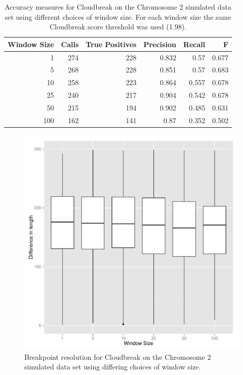 \begin{table}
\begin{center}
\begin{tabular}{r|rrrrr}
 \hline
 Window Size & Calls & True Positives & Precision & Recall & F \\ 
 \hline
   1 & 274 & 228 & 0.832 & 0.57 & 0.677 \\ 
   5 & 268 & 228 & 0.851 & 0.57 & 0.683 \\ 
   10 & 258 & 223 & 0.864 & 0.557 & 0.678 \\ 
   25 & 240 & 217 & 0.904 & 0.542 & 0.678 \\ 
   50 & 215 & 194 & 0.902 & 0.485 & 0.631 \\ 
   100 & 162 & 141 & 0.87 & 0.352 & 0.502 \\  
\end{tabular}
\end{center}
\caption{Accuracy measures for Cloudbreak on the Chromosome 2 simulated data set using different choices of window size. For each window size the same Cloudbreak score threshold was used (1.98).}
\label{chr2AccuracyByWindowSize}
\end{table}
\begin{figure}
\centering
\includegraphics[width=.8\textwidth]{figures/breakpoint_resolution_by_windowSize.pdf}
\caption{Breakpoint resolution for Cloudbreak on the Chromosome 2 simulated data set using differing choices of window size.}
\label{breakpoint_resolution_by_windowSize}
\end{figure}

